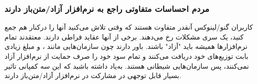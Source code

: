 \subsubsection{مردم احساسات متفاوتی راجع به نرم‌افزار آزاد/متن‌باز دارند}
کاربران گنو/لینوکس آنقدر متفاوت هستند که وقتی تلاش می‌کنید آنها را درکنار هم جمع کنید، یک سری
مشکلات رخ می‌دهند. برخی از آنها عقاید فراطی دارند. معتقدند تمام نرم‌افزارها همیشه باید "آزاد" باشند.
باور دارند چون سازمان‌هایی مانند
،  و 
مبلغ زیادی بابت توزیع‌های خود دریافت می‌کنند و تمام سود خود را صرف حمایت از نرم‌افزار آزاد نمی‌کنند،
پس سازمان‌هایی شیطانی هستند.
به‌یاد داشته باشید که این سه کمپانی تاثیر بسیار قابل توجهی در مشارکت در نرم‌افزار آزاد/متن‌باز دارند.

